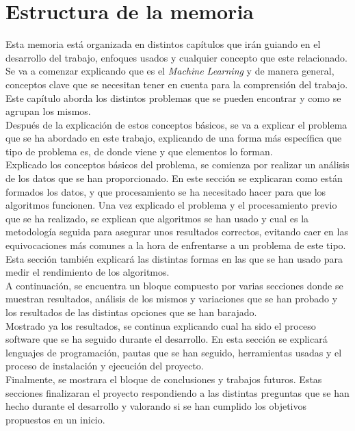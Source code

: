 \section{Estructura de la memoria}
Esta memoria está organizada en distintos capítulos que irán guiando en el desarrollo del trabajo, enfoques usados y cualquier concepto que este relacionado.\\
\linebreak
Se va a comenzar explicando que es el \textit{Machine Learning} y de manera general, conceptos clave que se necesitan tener en cuenta para la comprensión del trabajo. Este capítulo aborda los distintos problemas que se pueden encontrar y como se agrupan los mismos.\\
\linebreak
Después de la explicación de estos conceptos básicos, se va a explicar el problema que se ha abordado en este trabajo, explicando de una forma más específica que tipo de problema es, de donde viene y que elementos lo forman.\\
\linebreak
Explicado los conceptos básicos del problema, se comienza por realizar un análisis de los datos que se han proporcionado. En este sección se explicaran como están formados los datos, y que procesamiento se ha necesitado hacer para que los algoritmos funcionen.
\linebreak
Una vez explicado el problema y el procesamiento previo que se ha realizado, se explican que algoritmos se han usado y cual es la metodología seguida para asegurar unos resultados correctos, evitando caer en las equivocaciones más comunes a la hora de enfrentarse a un problema de este tipo. Esta sección también explicará las distintas formas en las que se han usado para medir el rendimiento de los algoritmos.\\
\linebreak
A continuación, se encuentra un bloque compuesto por varias secciones donde se muestran resultados, análisis de los mismos y variaciones que se han probado y los resultados de las distintas opciones que se han barajado.\\
\linebreak
Mostrado ya los resultados, se continua explicando cual ha sido el proceso software que se ha seguido durante el desarrollo. En esta sección se explicará lenguajes de programación, pautas que se han seguido, herramientas usadas y el proceso de instalación y ejecución del proyecto.\\
\linebreak
Finalmente, se mostrara el bloque de conclusiones y trabajos futuros. Estas secciones finalizaran el proyecto respondiendo a las distintas preguntas que se han hecho durante el desarrollo y valorando si se han cumplido los objetivos propuestos en un inicio.


